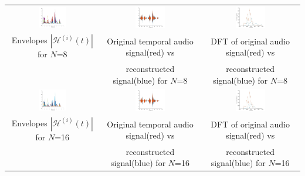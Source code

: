 \documentclass[a4paper,10pt]{article}
\begin{document}
\begin{center}
\begin{tiny}
\begin{tabular}{c c c}
\includegraphics[width=0.32\textwidth]{"a_8.jpg"} &
\includegraphics[width=0.32\textwidth]{"b_8.jpg"} &
\includegraphics[width=0.32\textwidth]{"c_8.jpg"} \\
Envelopes $|\mathcal{H}^{(i)}(t)|$ for $N$=8 &
Original temporal audio signal(red) vs  &
DFT of original audio signal(red) vs\\
&
reconstructed signal(blue) for $N$=8 &
reconstructed signal(blue) for $N$=8\\

\includegraphics[width=0.32\textwidth]{"a_16.jpg"} &
\includegraphics[width=0.32\textwidth]{"b_16.jpg"} &
\includegraphics[width=0.32\textwidth]{"c_16.jpg"} \\
Envelopes $|\mathcal{H}^{(i)}(t)|$ for $N$=16 &
Original temporal audio signal(red) vs  &
DFT of original audio signal(red) vs\\
&
reconstructed signal(blue) for $N$=16 &
reconstructed signal(blue) for $N$=16\\
\end{tabular}
\end{tiny}
\end{center}
\end{document}
